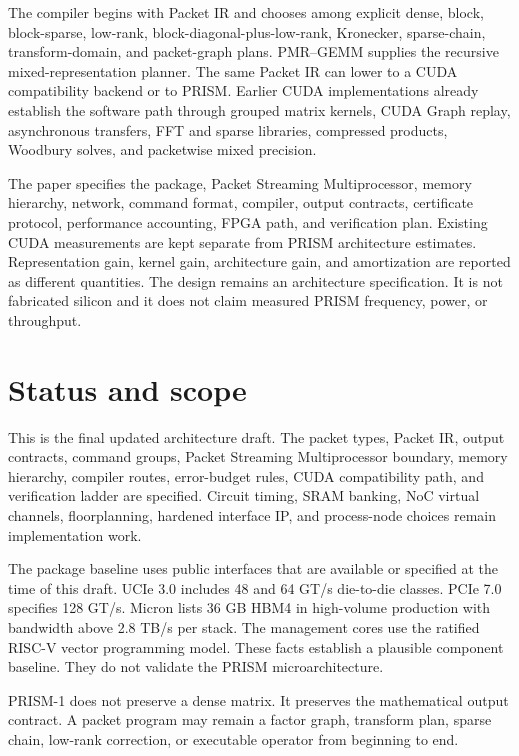 \documentclass[11pt,oneside,openany]{book}
\theoremstyle{remark}
\newcommand{\Callout}[1]{\noindent\colorbox{PaleBlue}{\parbox{0.965\linewidth}{\vspace{3pt}\small\RaggedRight #1\par\vspace{3pt}}}}
\begin{document}
The compiler begins with Packet IR and chooses among explicit dense, block, block-sparse, low-rank, block-diagonal-plus-low-rank, Kronecker, sparse-chain, transform-domain, and packet-graph plans. PMR--GEMM supplies the recursive mixed-representation planner. The same Packet IR can lower to a CUDA compatibility backend or to PRISM. Earlier CUDA implementations already establish the software path through grouped matrix kernels, CUDA Graph replay, asynchronous transfers, FFT and sparse libraries, compressed products, Woodbury solves, and packetwise mixed precision.

The paper specifies the package, Packet Streaming Multiprocessor, memory hierarchy, network, command format, compiler, output contracts, certificate protocol, performance accounting, FPGA path, and verification plan. Existing CUDA measurements are kept separate from PRISM architecture estimates. Representation gain, kernel gain, architecture gain, and amortization are reported as different quantities. The design remains an architecture specification. It is not fabricated silicon and it does not claim measured PRISM frequency, power, or throughput.

\clearpage
\chapter*{Status and scope}
This is the final updated architecture draft. The packet types, Packet IR, output contracts, command groups, Packet Streaming Multiprocessor boundary, memory hierarchy, compiler routes, error-budget rules, CUDA compatibility path, and verification ladder are specified. Circuit timing, SRAM banking, NoC virtual channels, floorplanning, hardened interface IP, and process-node choices remain implementation work.

The package baseline uses public interfaces that are available or specified at the time of this draft. UCIe 3.0 includes 48 and 64 GT/s die-to-die classes. PCIe 7.0 specifies 128 GT/s. Micron lists 36 GB HBM4 in high-volume production with bandwidth above 2.8 TB/s per stack. The management cores use the ratified RISC-V vector programming model. These facts establish a plausible component baseline. They do not validate the PRISM microarchitecture.

\Callout{PRISM-1 does not preserve a dense matrix. It preserves the mathematical output contract. A packet program may remain a factor graph, transform plan, sparse chain, low-rank correction, or executable operator from beginning to end.}
\end{document}

